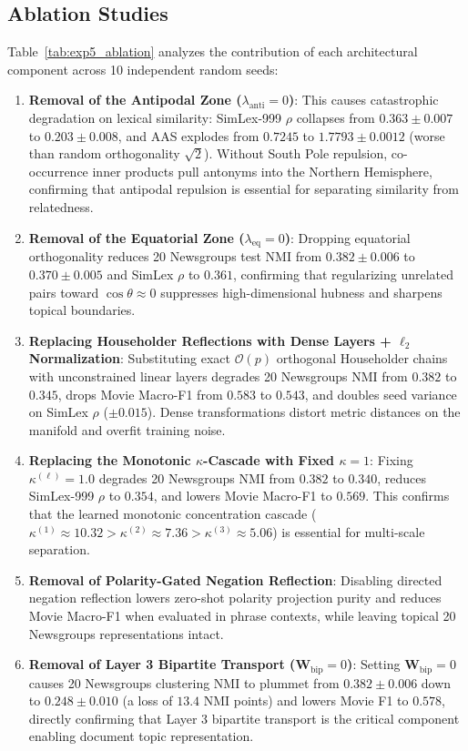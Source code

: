 \documentclass[journal]{IEEEtran}
\begin{document}
\subsection{Ablation Studies}
Table~\ref{tab:exp5_ablation} analyzes the contribution of each architectural component across 10 independent random seeds:
\begin{enumerate}
    \item \textbf{Removal of the Antipodal Zone ($\lambda_{\text{anti}} = 0$)}: This causes catastrophic degradation on lexical similarity: SimLex-999 $\rho$ collapses from $0.363 \pm 0.007$ to $0.203 \pm 0.008$, and AAS explodes from $0.7245$ to $1.7793 \pm 0.0012$ (worse than random orthogonality $\sqrt{2}$). Without South Pole repulsion, co-occurrence inner products pull antonyms into the Northern Hemisphere, confirming that antipodal repulsion is essential for separating similarity from relatedness.
    \item \textbf{Removal of the Equatorial Zone ($\lambda_{\text{eq}} = 0$)}: Dropping equatorial orthogonality reduces 20 Newsgroups test NMI from $0.382 \pm 0.006$ to $0.370 \pm 0.005$ and SimLex $\rho$ to $0.361$, confirming that regularizing unrelated pairs toward $\cos\theta \approx 0$ suppresses high-dimensional hubness and sharpens topical boundaries.
    \item \textbf{Replacing Householder Reflections with Dense Layers + $\ell_2$ Normalization}: Substituting exact $\mathcal{O}(p)$ orthogonal Householder chains with unconstrained linear layers degrades 20 Newsgroups NMI from $0.382$ to $0.345$, drops Movie Macro-F1 from $0.583$ to $0.543$, and doubles seed variance on SimLex $\rho$ ($\pm 0.015$). Dense transformations distort metric distances on the manifold and overfit training noise.
    \item \textbf{Replacing the Monotonic $\kappa$-Cascade with Fixed $\kappa = 1$}: Fixing $\kappa^{(\ell)} = 1.0$ degrades 20 Newsgroups NMI from $0.382$ to $0.340$, reduces SimLex-999 $\rho$ to $0.354$, and lowers Movie Macro-F1 to $0.569$. This confirms that the learned monotonic concentration cascade ($\kappa^{(1)} \approx 10.32 > \kappa^{(2)} \approx 7.36 > \kappa^{(3)} \approx 5.06$) is essential for multi-scale separation.
    \item \textbf{Removal of Polarity-Gated Negation Reflection}: Disabling directed negation reflection lowers zero-shot polarity projection purity and reduces Movie Macro-F1 when evaluated in phrase contexts, while leaving topical 20 Newsgroups representations intact.
    \item \textbf{Removal of Layer 3 Bipartite Transport ($\mathbf{W}_{\text{bip}} = 0$)}: Setting $\mathbf{W}_{\text{bip}} = 0$ causes 20 Newsgroups clustering NMI to plummet from $0.382 \pm 0.006$ down to $0.248 \pm 0.010$ (a loss of $13.4$ NMI points) and lowers Movie F1 to $0.578$, directly confirming that Layer 3 bipartite transport is the critical component enabling document topic representation.
\end{enumerate}
\end{document}
